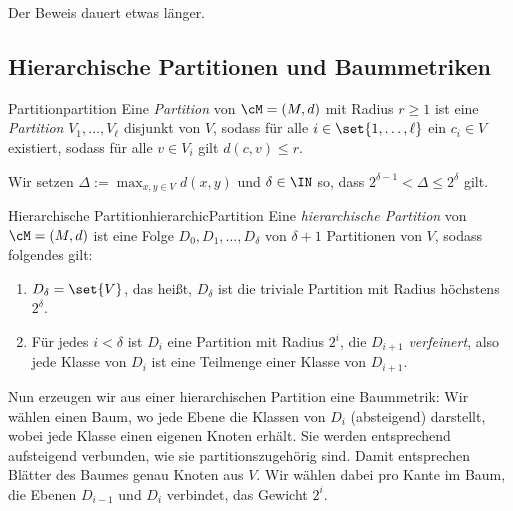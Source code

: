 \documentclass[language=ngerman,algolist]{TemplateLecture}
\begin{document}
Der Beweis dauert etwas länger.

\subsection{Hierarchische Partitionen und Baummetriken}

\begin{defi}{Partition}{partition}
    Eine \emph{Partition} von $\cM = (M, d)$ mit Radius $r \geq 1$ ist eine \emph{Partition} $V_1, \ldots, V_\ell$ disjunkt von $V$, sodass für alle $i \in \set{1,\ldots,\ell}$ ein $c_i \in V$ existiert, sodass für alle $v \in V_i$ gilt $d(c, v) \leq r$.
\end{defi}
Wir setzen $\Delta := \max_{x, y \in V} d(x,y)$ und $\delta \in \IN$ so, dass $2^{\delta - 1} < \Delta \leq 2^\delta$ gilt.

\begin{defi}{Hierarchische Partition}{hierarchicPartition}
    Eine \emph{hierarchische Partition} von $\cM = (M, d)$ ist eine Folge $D_0, D_1, \ldots, D_\delta$ von $\delta + 1$ Partitionen von $V$, sodass folgendes gilt:
    \begin{enumerate}
        \item $D_\delta = \set{V}$, das heißt, $D_\delta$ ist die triviale Partition mit Radius höchstens $2^\delta$.
        \item Für jedes $i < \delta$ ist $D_i$ eine Partition mit Radius $2^i$, die $D_{i+1}$ \emph{verfeinert}, also jede Klasse von $D_i$ ist eine Teilmenge einer Klasse von $D_{i+1}$.
    \end{enumerate}
\end{defi}

Nun erzeugen wir aus einer hierarchischen Partition eine Baummetrik: Wir wählen einen Baum, wo jede Ebene die Klassen von $D_i$ (absteigend) darstellt, wobei jede Klasse einen eigenen Knoten erhält. Sie werden entsprechend aufsteigend verbunden, wie sie partitionszugehörig sind. Damit entsprechen Blätter des Baumes genau Knoten aus $V$. Wir wählen dabei pro Kante im Baum, die Ebenen $D_{i-1}$ und $D_i$ verbindet, das Gewicht $2^i$.
\end{document}
